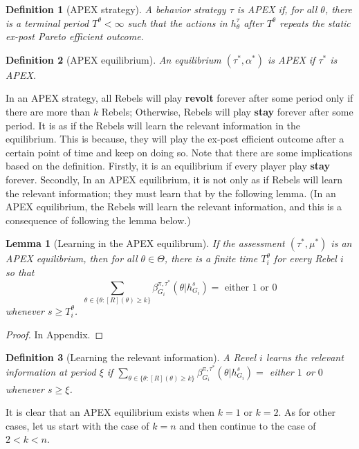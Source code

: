 \documentclass[12pt,letter]{article}
\newtheorem{lemma}{Lemma}[section]
\newtheorem{definition}{Definition}[section]
\theoremstyle{definition}
\theoremstyle{remark}
\theoremstyle{claim}
\begin{document}
\begin{definition}[APEX strategy]
A behavior strategy $\tau$ is APEX  if, for all $\theta$, there is a terminal period $T^{\theta}<\infty$ such that the actions in $h^{\tau}_{\theta}$ after $T^{\theta}$ repeats the static ex-post Pareto efficient outcome.
\end{definition}

\begin{definition}[APEX equilibrium]\label{Def_ex-post_efficient}
An equilibrium $(\tau^{*},\alpha^{*})$ is APEX if $\tau^{*}$ is APEX.
\end{definition}




In an APEX strategy, all Rebels will play \textbf{revolt} forever after some period only if there are more than $k$ Rebels; Otherwise, Rebels will play \textbf{stay} forever after some period. It is as if the Rebels will learn the relevant information in the equilibrium. This is because, they will play the ex-post efficient outcome after a certain point of time and keep on doing so. Note that there are some implications based on the definition. Firstly, it is an equilibrium if every player play \textbf{stay} forever. Secondly, In an APEX equilibrium, it is not only as if Rebels will learn the relevant information; they must learn that by the following lemma. (In an APEX equilibrium, the Rebels will learn the relevant information, and this is a consequence of following the lemma below.)
\begin{lemma}[Learning in the APEX equilibrum]\label{lemma_learn}
If the assessment $(\tau^*,\mu^{*})$ is an APEX equilibrium, then for all $\theta\in \Theta$, there is a finite time $T^{\theta}_i$ for every Rebel $i$ so that 
\[\sum_{\theta\in\{\theta:[R](\theta)\geq k\}}\beta^{\pi,\tau^*}_{G_i}(\theta|h^{s}_{G_i})= \text{ either } 1 \text{ or } 0\]
whenever $s\geq T^{\theta}_i$.
\end{lemma}

\begin{proof}
In Appendix.
\end{proof}

\begin{definition}[Learning the relevant information]\label{def_learn}
A Revel $i$ learns the relevant information at period $\xi$ if $\sum_{\theta\in\{\theta:[R](\theta)\geq k\}}\beta^{\pi,\tau^*}_{G_i}(\theta|h^{s}_{G_i})=$ either $1$ or $0$ whenever $s\geq \xi$.
\end{definition}

It is clear that an APEX equilibrium exists when $k=1$ or $k=2$. As for other cases, let us start with the case of $k=n$ and then continue to the case of $2<k<n$.
\end{document}

